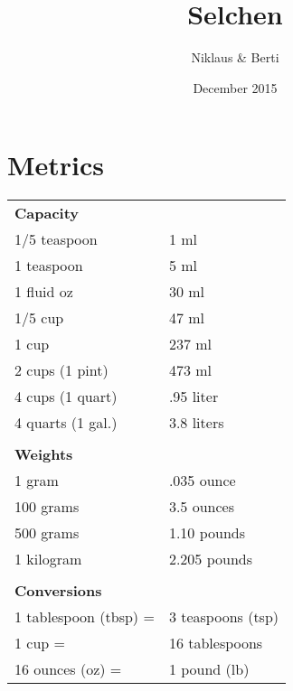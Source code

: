 \documentclass{article}
\author{Niklaus \& Berti}
\date{December 2015}
\title{Selchen}
\begin{document}
\maketitle{}
\pagebreak
\tableofcontents

\pagebreak

\section{Metrics}
\begin{tabular}{ l | l  }
\multicolumn{2}{l}{\textbf{Capacity}}  \\
1/5 teaspoon 	& 1 ml	\\
1 teaspoon 	& 5 ml	\\
1 fluid oz	&30 ml	 \\	 
1/5 cup 	&47 ml	 \\	 
1 cup 	&237 ml	 	\\ 
2 cups (1 pint) &	473 ml	 	\\ 
4 cups (1 quart) &	.95 liter	\\ 	 
4 quarts (1 gal.) &	3.8 liters	\\ 	 
\multicolumn{2}{c}{} \\
\multicolumn{2}{l}{\textbf{Weights}} \\
1 gram &	.035 ounce\\
100 grams& 	3.5 ounces\\
500 grams&	1.10 pounds\\
1 kilogram &	2.205 pounds \\
\multicolumn{2}{c}{} \\
\multicolumn{2}{l}{\textbf{Conversions}} \\
1 tablespoon (tbsp) =& 	3 teaspoons (tsp)\\
1 cup =& 	16 tablespoons\\
16 ounces (oz) = &	1 pound (lb)
\end{tabular}


\pagebreak



\pagebreak
\end{document}
